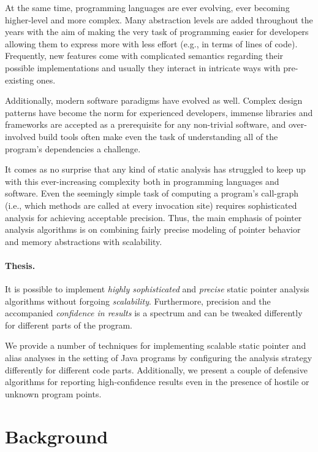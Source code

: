 At the same time, programming languages are ever evolving, ever becoming
higher-level and more complex. Many abstraction levels are added throughout the
years with the aim of making the very task of programming easier for developers
allowing them to express more with less effort (e.g., in terms of lines of
code). Frequently, new features come with complicated semantics regarding their
possible implementations and usually they interact in intricate ways with
pre-existing ones.

Additionally, modern software paradigms have evolved as well. Complex design
patterns have become the norm for experienced developers, immense libraries and
frameworks are accepted as a prerequisite for any non-trivial software, and
over-involved build tools often make even the task of understanding all of the
program's dependencies a challenge.

It comes as no surprise that any kind of static analysis has struggled to keep
up with this ever-increasing complexity both in programming languages and
software. Even the seemingly simple task of computing a program's call-graph
(i.e., which methods are called at every invocation site) requires
sophisticated analysis for achieving acceptable precision. Thus, the main
emphasis of pointer analysis algorithms is on combining fairly precise modeling
of pointer behavior and memory abstractions with scalability.

\paragraph*{Thesis.}
\begin{displayquote}
It is possible to implement \emph{highly sophisticated} and \emph{precise}
	static pointer analysis algorithms without forgoing \emph{scalability}.
	Furthermore, precision and the accompanied \emph{confidence in results} is
	a spectrum and can be tweaked differently for different parts of the
	program.
\end{displayquote}

We provide a number of techniques for implementing scalable static pointer and
alias analyses in the setting of Java programs by configuring the analysis
strategy differently for different code parts. Additionally, we present a
couple of defensive algorithms for reporting high-confidence results even in
the presence of hostile or unknown program points.


\section{Background}

